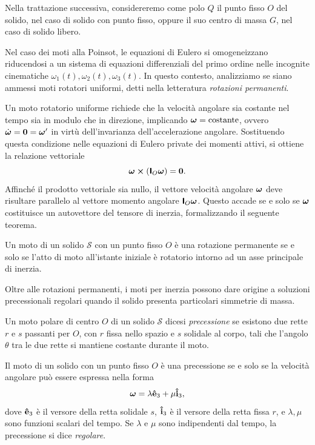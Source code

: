Nella trattazione successiva, considereremo come polo $Q$ il punto fisso $O$ del solido, nel caso di solido con punto fisso, oppure il suo centro di massa $G$, nel caso di solido libero.

Nel caso dei moti alla Poinsot, le equazioni di Eulero si omogeneizzano riducendosi a un sistema di equazioni differenziali del primo ordine nelle incognite cinematiche $\omega_1(t), \omega_2(t), \omega_3(t)$. In questo contesto, analizziamo se siano ammessi moti rotatori uniformi, detti nella letteratura \emph{rotazioni permanenti}.

Un moto rotatorio uniforme richiede che la velocità angolare sia costante nel tempo sia in modulo che in direzione, implicando $\vb*{\omega} = \text{costante}$, ovvero $\dot{\vb*{\omega}} = \vb{0} = \vb*{\omega}'$ in virtù dell'invarianza dell'accelerazione angolare. Sostituendo questa condizione nelle equazioni di Eulero private dei momenti attivi, si ottiene la relazione vettoriale
\begin{equation*}
    \vb*{\omega} \cross (\boldsymbol{\mathsf{I}}_O \vb*{\omega}) = \vb{0}.
\end{equation*}
Affinché il prodotto vettoriale sia nullo, il vettore velocità angolare $\vb*{\omega}$ deve risultare parallelo al vettore momento angolare $\boldsymbol{\mathsf{I}}_O \vb*{\omega}$. Questo accade se e solo se $\vb*{\omega}$ costituisce un autovettore del tensore di inerzia, formalizzando il seguente teorema.

\begin{theorem}
    Un moto di un solido $\mathcal{S}$ con un punto fisso $O$ è una rotazione permanente se e solo se l'atto di moto all'istante iniziale è rotatorio intorno ad un asse principale di inerzia.
\end{theorem}

Oltre alle rotazioni permanenti, i moti per inerzia possono dare origine a soluzioni precessionali regolari quando il solido presenta particolari simmetrie di massa.

\begin{definition}
    Un moto polare di centro $O$ di un solido $\mathcal{S}$ dicesi \emph{precessione} se esistono due rette $r$ e $s$ passanti per $O$, con $r$ fissa nello spazio e $s$ solidale al corpo, tali che l'angolo $\theta$ tra le due rette si mantiene costante durante il moto.
\end{definition}

\begin{proposition} \label{prop:precessione}
    Il moto di un solido con un punto fisso $O$ è una precessione se e solo se la velocità angolare può essere espressa nella forma
    \begin{equation*}
        \vb*{\omega} = \lambda \vu{e}_3 + \mu \vu{i}_3,
    \end{equation*}
    dove $\vu{e}_3$ è il versore della retta solidale $s$, $\vu{i}_3$ è il versore della retta fissa $r$, e $\lambda, \mu$ sono funzioni scalari del tempo. Se $\lambda$ e $\mu$ sono indipendenti dal tempo, la precessione si dice \emph{regolare}.
\end{proposition}

